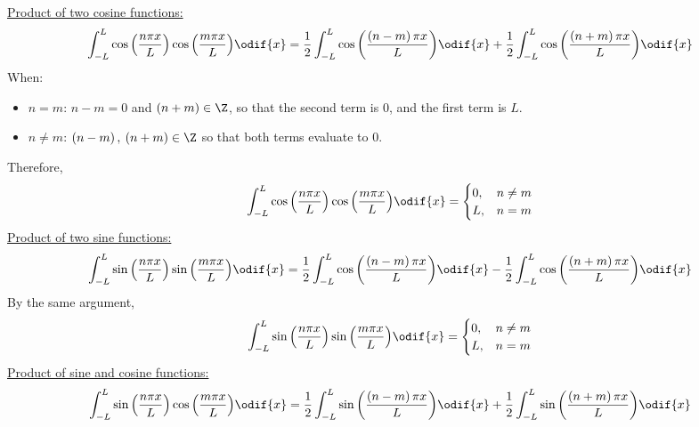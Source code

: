\documentclass{article}
\begin{document}
\underline{Product of two cosine functions:}
\begin{equation*}
    \int_{-L}^L \cos{\left( \frac{n \pi x}{L} \right)} \cos{\left( \frac{m \pi x}{L} \right)} \odif{x} = \frac{1}{2} \int_{-L}^L \cos{\left( \frac{\left( n - m \right) \pi x}{L} \right)} \odif{x} + \frac{1}{2} \int_{-L}^L \cos{\left( \frac{\left( n + m \right) \pi x}{L} \right)} \odif{x}
\end{equation*}
When:
\begin{itemize}
    \item \(n = m\): \(n - m = 0\) and \(\left( n + m \right) \in \Z\), so that the second
          term is \(0\), and the first term is \(L\).
    \item \(n \neq m\): \(\left( n - m \right),\: \left( n + m \right) \in \Z\) so that both terms evaluate to \(0\).
\end{itemize}
Therefore,
\begin{equation*}
    \int_{-L}^L \cos{\left( \frac{n \pi x}{L} \right)} \cos{\left( \frac{m \pi x}{L} \right)} \odif{x} =
    \begin{cases}
        0, & n \neq m \\
        L, & n = m
    \end{cases}
\end{equation*}
\underline{Product of two sine functions:}
\begin{equation*}
    \int_{-L}^L \sin{\left( \frac{n \pi x}{L} \right)} \sin{\left( \frac{m \pi x}{L} \right)} \odif{x} = \frac{1}{2} \int_{-L}^L \cos{\left( \frac{\left( n - m \right) \pi x}{L} \right)} \odif{x} - \frac{1}{2} \int_{-L}^L \cos{\left( \frac{\left( n + m \right) \pi x}{L} \right)} \odif{x}
\end{equation*}
By the same argument,
\begin{equation*}
    \int_{-L}^L \sin{\left( \frac{n \pi x}{L} \right)} \sin{\left( \frac{m \pi x}{L} \right)} \odif{x} =
    \begin{cases}
        0, & n \neq m \\
        L, & n = m
    \end{cases}
\end{equation*}
\underline{Product of sine and cosine functions:}
\begin{equation*}
    \int_{-L}^L \sin{\left( \frac{n \pi x}{L} \right)} \cos{\left( \frac{m \pi x}{L} \right)} \odif{x} = \frac{1}{2} \int_{-L}^L \sin{\left( \frac{\left( n - m \right) \pi x}{L} \right)} \odif{x} + \frac{1}{2} \int_{-L}^L \sin{\left( \frac{\left( n + m \right) \pi x}{L} \right)} \odif{x}
\end{equation*}
\end{document}
